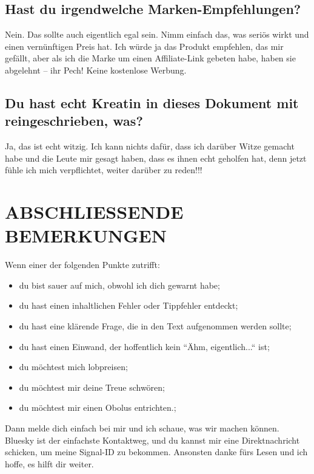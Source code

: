 \documentclass{article}
\begin{document}
\subsection{Hast du irgendwelche Marken-Empfehlungen?}

Nein. Das sollte auch eigentlich egal sein. Nimm einfach das, was seriös wirkt und einen vernünftigen Preis hat. Ich würde ja das Produkt empfehlen, das mir gefällt, aber als ich die Marke um einen Affiliate-Link gebeten habe, haben sie abgelehnt – ihr Pech! Keine kostenlose Werbung.

\subsection{Du hast echt Kreatin in dieses Dokument mit reingeschrieben, was?}

Ja, das ist echt witzig. Ich kann nichts dafür, dass ich darüber Witze gemacht habe und die Leute mir gesagt haben, dass es ihnen echt geholfen hat, denn jetzt fühle ich mich verpflichtet, weiter darüber zu reden!!!

\section{ABSCHLIESSENDE BEMERKUNGEN}

Wenn einer der folgenden Punkte zutrifft:

\begin{itemize}
\item du bist sauer auf mich, obwohl ich dich gewarnt habe;

\item du hast einen inhaltlichen Fehler oder Tippfehler entdeckt;

\item du hast eine klärende Frage, die in den Text aufgenommen werden sollte;

\item du hast einen Einwand, der hoffentlich kein “Ähm, eigentlich...“ ist;

\item du möchtest mich lobpreisen;

\item du möchtest mir deine Treue schwören; 

\item du möchtest mir einen Obolus entrichten.;
\end{itemize}

Dann melde dich einfach bei mir und ich schaue, was wir machen können. Bluesky ist der einfachste Kontaktweg, und du kannst mir eine Direktnachricht schicken, um meine Signal-ID zu bekommen. Ansonsten danke fürs Lesen und ich hoffe, es hilft dir weiter.
\end{document}
